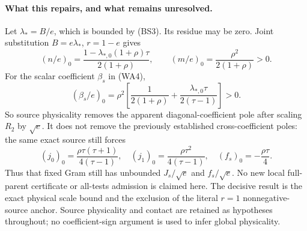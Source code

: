 \paragraph{What this repairs, and what remains unresolved.}
Let $\lambda_*=B/e$, which is bounded by (BS3). Its residue may
be zero. Joint substitution $B=e\lambda_*$, $r=1-e$ gives
\[
 (n/e)_0=\frac{1-\lambda_{*,0}(1+\rho)\tau}{2(1+\rho)},
 \qquad (m/e)_0=\frac{\rho^2}{2(1+\rho)}>0.           \tag{BS5}
\]
For the scalar coefficient $\beta_s$ in (WA4),
\[
 (\beta_s/e)_0
 =\rho^2\left[\frac1{2(1+\rho)}
                   +\frac{\lambda_{*,0}\tau}{2(\tau-1)}\right]>0.
                                                               \tag{BS6}
\]
So source physicality removes the apparent diagonal-coefficient
pole after scaling $R_2$ by $\sqrt e$.
It does not remove the previously established cross-coefficient
poles: the same exact source still forces
\[
 (j_0)_0=\frac{\rho\tau(\tau+1)}{4(\tau-1)},\quad
 (j_1)_0=\frac{\rho\tau^2}{4(\tau-1)},\quad
 (f_s)_0=-\frac{\rho\tau}{4}.
\]
Thus that fixed Gram still has unbounded $J_s/\sqrt e$ and
$f_s/\sqrt e$. No new local full-parent certificate or all-tests
admission is claimed here. The decisive result is the exact
physical scale bound and the exclusion of the literal $r=1$
nonnegative-source anchor. Source physicality and contact are
retained as hypotheses throughout; no coefficient-sign argument
is used to infer global physicality.
